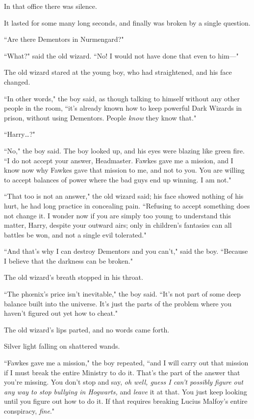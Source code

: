 In that office there was silence.

It lasted for some many long seconds, and finally was broken by a single question.

``Are there Dementors in Nurmengard?"

``What?" said the old wizard. ``No! I would not have done that even to him—"

\later

The old wizard stared at the young boy, who had straightened, and his face changed.

``In other words," the boy said, as though talking to himself without any other people in the room, ``it's already known how to keep powerful Dark Wizards in prison, without using Dementors. People \emph{know} they know that."

``Harry{\ldots}?"

``No," the boy said. The boy looked up, and his eyes were blazing like green fire. ``I do not accept your answer, Headmaster. Fawkes gave me a mission, and I know now why Fawkes gave that mission to me, and not to you. You are willing to accept balances of power where the bad guys end up winning. I am not."

``That too is not an answer," the old wizard said; his face showed nothing of his hurt, he had long practice in concealing pain. ``Refusing to accept something does not change it. I wonder now if you are simply too young to understand this matter, Harry, despite your outward airs; only in children's fantasies can all battles be won, and not a single evil tolerated."

``And that's why I can destroy Dementors and you can't," said the boy. ``Because I believe that the darkness can be broken."

The old wizard's breath stopped in his throat.

``The phœnix's price isn't inevitable," the boy said. ``It's not part of some deep balance built into the universe. It's just the parts of the problem where you haven't figured out yet how to cheat."

The old wizard's lips parted, and no words came forth.

Silver light falling on shattered wands.

``Fawkes gave me a mission," the boy repeated, ``and I will carry out that mission if I must break the entire Ministry to do it. That's the part of the answer that you're missing. You don't stop and say, \emph{oh well, guess I can't possibly figure out any way to stop bullying in Hogwarts,} and \emph{leave} it at that. You just keep looking until you figure out how to do it. If that requires breaking Lucius Malfoy's entire conspiracy, \emph{fine}."

